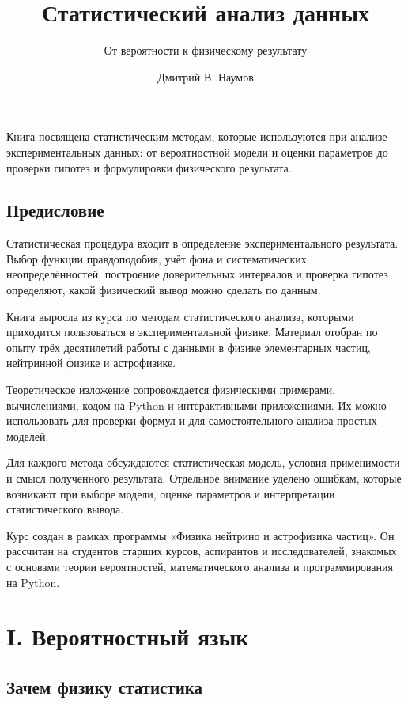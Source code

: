\documentclass[
  russian,
  11pt,
  a4paper,
  open=any]{scrbook}
\title{Статистический анализ данных}
\subtitle{От вероятности к физическому результату}
\author{Дмитрий В. Наумов}
\date{}
\newif\ifbookpagenavigator
\newcommand{\NeutrinoHitFrontCover}{%
  \hypersetup{pageanchor=false}%
  \begingroup
  \ifdefined\bookpagenavigatorfalse\bookpagenavigatorfalse\fi
  \endgroup
  \hypersetup{pageanchor=true}%
}
\renewcommand{\maketitle}{%
    \NeutrinoHitFrontCover
    \tableofcontents
    \clearpage
  }%
\begin{document}
\frontmatter
\maketitle


\mainmatter
Книга посвящена статистическим методам, которые используются при анализе
экспериментальных данных: от вероятностной модели и оценки параметров до
проверки гипотез и формулировки физического результата.


\chapter*{Предисловие}\label{ux43fux440ux435ux434ux438ux441ux43bux43eux432ux438ux435}


Статистическая процедура входит в определение экспериментального
результата. Выбор функции правдоподобия, учёт фона и систематических
неопределённостей, построение доверительных интервалов и проверка
гипотез определяют, какой физический вывод можно сделать по данным.

Книга выросла из курса по методам статистического анализа, которыми
приходится пользоваться в экспериментальной физике. Материал отобран по
опыту трёх десятилетий работы с данными в физике элементарных частиц,
нейтринной физике и астрофизике.

Теоретическое изложение сопровождается физическими примерами,
вычислениями, кодом на Python и интерактивными приложениями. Их можно
использовать для проверки формул и для самостоятельного анализа простых
моделей.

Для каждого метода обсуждаются статистическая модель, условия
применимости и смысл полученного результата. Отдельное внимание уделено
ошибкам, которые возникают при выборе модели, оценке параметров и
интерпретации статистического вывода.

Курс создан в рамках программы «Физика нейтрино и астрофизика частиц».
Он рассчитан на студентов старших курсов, аспирантов и исследователей,
знакомых с основами теории вероятностей, математического анализа и
программирования на Python.

\part{I. Вероятностный язык}

\chapter{Зачем физику
статистика}\label{ux437ux430ux447ux435ux43c-ux444ux438ux437ux438ux43aux443-ux441ux442ux430ux442ux438ux441ux442ux438ux43aux430}
\end{document}
